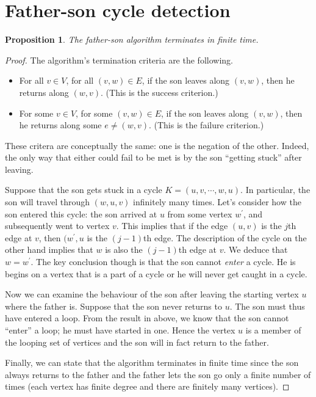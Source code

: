 \documentclass[11pt,letterpaper]{article}
\newtheorem{proposition}{Proposition}
\begin{document}
\section{Father-son cycle detection}

\begin{proposition}
    The father-son algorithm terminates in finite time.
\end{proposition}

\begin{proof}
    The algorithm's termination criteria are the following.

    \begin{itemize}
        \item
            For all $v \in V$, for all $(v, w) \in E$, if the son leaves along
            $(v, w)$, then he returns along $(w, v)$. (This is the success
            criterion.)

        \item
            For some $v \in V$, for some $(v, w) \in E$, if the son leaves
            along $(v, w)$, then he returns along some $e \neq (w, v)$. (This
            is the failure criterion.)
    \end{itemize}

    These critera are conceptually the same: one is the negation of the other.
    Indeed, the only way that either could fail to be met is by the son
    ``getting stuck'' after leaving.

    Suppose that the son gets stuck in a cycle $K = (u, v, \cdots, w, u)$. In
    particular, the son will travel through $(w, u, v)$ infinitely many times.
    Let's consider how the son entered this cycle: the son arrived at $u$ from
    some vertex $w^\prime$, and subsequently went to vertex $v$. This implies
    that if the edge $(u, v)$ is the $j$th edge at $v$, then $(w^\prime, u$ is
    the $(j-1)$th edge. The description of the cycle on the other hand implies
    that $w$ is also the $(j-1)$th edge at $v$. We deduce that $w = w^\prime$.
    The key conclusion though is that the son cannot \emph{enter} a cycle. He
    is begins on a vertex that is a part of a cycle or he will never get caught
    in a cycle.

    Now we can examine the behaviour of the son after leaving the starting
    vertex $u$ where the father is. Suppose that the son never returns to $u$.
    The son must thus have entered a loop. From the result in above, we know
    that the son cannot ``enter'' a loop; he must have started in one. Hence
    the vertex $u$ is a member of the looping set of vertices and the son will
    in fact return to the father.

    Finally, we can state that the algorithm terminates in finite time since
    the son always returns to the father and the father lets the son go only a
    finite number of times (each vertex has finite degree and there are
    finitely many vertices).
\end{proof}
\end{document}
